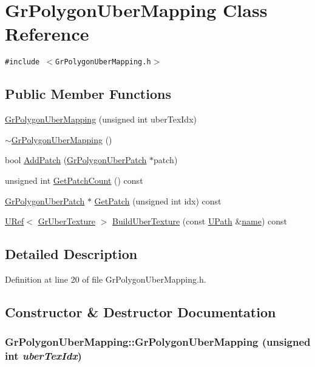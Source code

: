 \hypertarget{class_gr_polygon_uber_mapping}{
\section{GrPolygonUberMapping Class Reference}
\label{class_gr_polygon_uber_mapping}
}
{\tt \#include $<$GrPolygonUberMapping.h$>$}

\subsection*{Public Member Functions}
\begin{CompactItemize}
\item 
\hyperlink{class_gr_polygon_uber_mapping_4a0a0bb05cf7d20a0dd1f77b2b9f07f3}{GrPolygonUberMapping} (unsigned int uberTexIdx)
\item 
\hyperlink{class_gr_polygon_uber_mapping_730ff767c130a871870c2107982b87c5}{$\sim$GrPolygonUberMapping} ()
\item 
bool \hyperlink{class_gr_polygon_uber_mapping_88872a6fb1778fa4e09bff4f4c58d5c6}{AddPatch} (\hyperlink{class_gr_polygon_uber_patch}{GrPolygonUberPatch} $\ast$patch)
\item 
unsigned int \hyperlink{class_gr_polygon_uber_mapping_6ca0b2ef19243ef6fe5641e06b411297}{GetPatchCount} () const 
\item 
\hyperlink{class_gr_polygon_uber_patch}{GrPolygonUberPatch} $\ast$ \hyperlink{class_gr_polygon_uber_mapping_9d12426e8c882349e60b9c158f5d62a3}{GetPatch} (unsigned int idx) const 
\item 
\hyperlink{class_u_ref}{URef}$<$ \hyperlink{class_gr_uber_texture}{GrUberTexture} $>$ \hyperlink{class_gr_polygon_uber_mapping_8add114b32b211f1e61ea5aa43b54220}{BuildUberTexture} (const \hyperlink{class_u_path}{UPath} \&\hyperlink{glext__bak_8h_bb62efe59ccdd153ce42e1a418352209}{name}) const 
\end{CompactItemize}


\subsection{Detailed Description}


Definition at line 20 of file GrPolygonUberMapping.h.

\subsection{Constructor \& Destructor Documentation}
\hypertarget{class_gr_polygon_uber_mapping_4a0a0bb05cf7d20a0dd1f77b2b9f07f3}{
\subsubsection[{GrPolygonUberMapping}]{\setlength{\rightskip}{0pt plus 5cm}GrPolygonUberMapping::GrPolygonUberMapping (unsigned int {\em uberTexIdx})}}
\label{class_gr_polygon_uber_mapping_4a0a0bb05cf7d20a0dd1f77b2b9f07f3}




